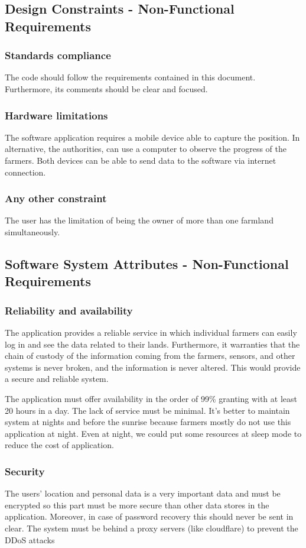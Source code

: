 \subsection{Design Constraints - Non-Functional Requirements}
    \subsubsection{Standards compliance}
    The code should follow the requirements contained in this document. Furthermore, its comments should be clear and focused.
    \subsubsection{Hardware limitations}
    The software application requires a mobile device able to capture the position. In alternative, the authorities, can use a computer to observe the progress of the farmers. Both devices can be able to send data to the software via internet connection.
    \subsubsection{Any other constraint}
    The user has the limitation of being the owner of more than one farmland simultaneously.
\subsection{Software System Attributes - Non-Functional Requirements}
    \subsubsection{Reliability and availability}
    The application provides a reliable service in which individual farmers can easily log in and see the data related to their lands. Furthermore, it warranties that the chain of custody of the information coming from the farmers, sensors, and other systems is never broken, and the information is never altered. This would provide a secure and reliable system.
    
    The application must offer availability in the order of 99\% granting with at least 20 hours in a day. The lack of service must be minimal. It’s better to maintain system at nights and before the sunrise because farmers mostly do not use this application at night. Even at night, we could put some resources at sleep mode to reduce the cost of application.
    
    \subsubsection{Security}
    The users’ location and personal data is a very important data and must be encrypted so this part must be more secure than other data stores in the application. Moreover, in case of password recovery this should never be sent in clear. The system must be behind a proxy servers (like cloudflare) to prevent the DDoS attacks
